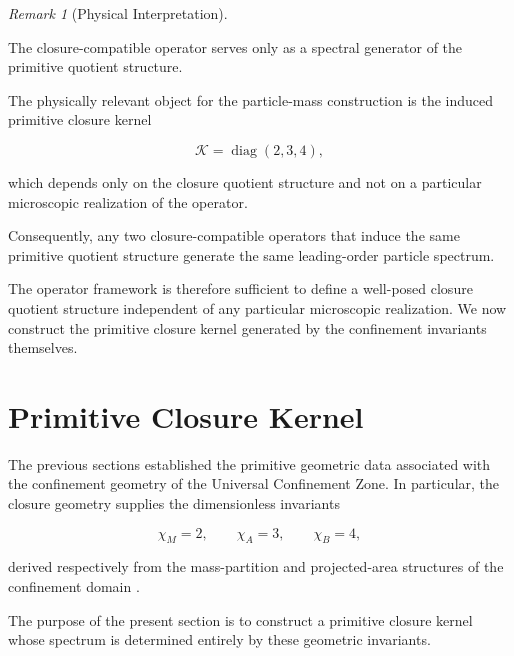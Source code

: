 \documentclass[11pt]{article}
\theoremstyle{definition}
\theoremstyle{remark}
\newtheorem{remark}[theorem]{Remark}
\begin{document}
\begin{remark}[Physical Interpretation]
\label{rem:operator_interpretation}

The closure-compatible operator serves only as a spectral
generator of the primitive quotient structure.

The physically relevant object for the particle-mass
construction is the induced primitive closure kernel

\begin{equation}
\mathcal K
=
\operatorname{diag}(2,3,4),
\end{equation}

which depends only on the closure quotient structure and not on
a particular microscopic realization of the operator.

Consequently, any two closure-compatible operators that induce
the same primitive quotient structure generate the same
leading-order particle spectrum.

\end{remark}

The operator framework is therefore sufficient to define a
well-posed closure quotient structure independent of any
particular microscopic realization. We now construct the
primitive closure kernel generated by the confinement
invariants themselves.


\section{Primitive Closure Kernel}
\label{sec:primitive_closure_kernel}

The previous sections established the primitive geometric data
associated with the confinement geometry of the Universal
Confinement Zone. In particular, the closure geometry supplies
the dimensionless invariants

\begin{equation}
\chi_M = 2,
\qquad
\chi_A = 3,
\qquad
\chi_B = 4,
\end{equation}

derived respectively from the mass-partition and projected-area
structures of the confinement domain \cite{Egbon2025I}.

The purpose of the present section is to construct a primitive
closure kernel whose spectrum is determined entirely by these
geometric invariants.

\end{document}
